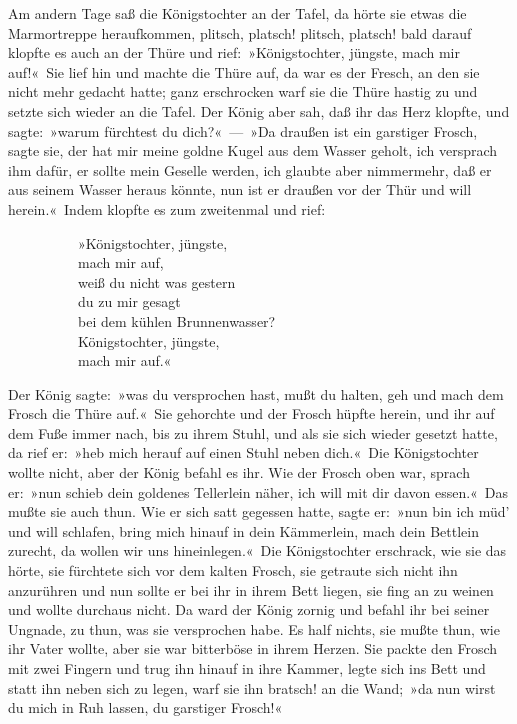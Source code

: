 Am andern Tage saß die Königstochter an der Tafel, da hörte sie etwas die Marmortreppe heraufkommen, plitsch, platsch! plitsch, platsch! bald darauf klopfte es auch an der Thüre und rief: »Königstochter, jüngste, mach mir auf!« Sie lief hin und machte die Thüre auf, da war es der Fresch, an den sie nicht mehr gedacht hatte; ganz erschrocken warf sie die Thüre hastig zu und setzte sich wieder an die Tafel. Der König aber sah, daß ihr das Herz klopfte, und sagte: »warum fürchtest du dich?« — »Da draußen ist ein garstiger Frosch, sagte sie, der hat mir meine goldne Kugel aus dem Wasser geholt, ich versprach ihm dafür, er sollte mein Geselle werden, ich glaubte aber nimmermehr, daß er aus seinem Wasser heraus könnte, nun ist er draußen vor der Thür und will herein.« Indem klopfte es zum zweitenmal und rief:

          »Königstochter, jüngste,\\
          mach mir auf,\\
          weiß du nicht was gestern\\
          du zu mir gesagt\\
          bei dem kühlen Brunnenwasser?\\
          Königstochter, jüngste,\\
          mach mir auf.«

Der König sagte: »was du versprochen hast, mußt du halten, geh und mach dem Frosch die Thüre auf.« Sie gehorchte und der Frosch hüpfte herein, und ihr auf dem Fuße immer nach, bis zu ihrem Stuhl, und als sie sich wieder gesetzt hatte, da rief er: »heb mich herauf auf einen Stuhl neben dich.« Die Königstochter wollte nicht, aber der König befahl es ihr. Wie der Frosch oben war, sprach er: »nun schieb dein goldenes Tellerlein näher, ich will mit dir davon essen.« Das mußte sie auch thun. Wie er sich satt gegessen hatte, sagte er: »nun bin ich müd’ und will schlafen, bring mich hinauf in dein Kämmerlein, mach dein Bettlein zurecht, da wollen wir uns hineinlegen.« Die Königstochter erschrack, wie sie das hörte, sie fürchtete sich vor dem kalten Frosch, sie getraute sich nicht ihn anzurühren und nun sollte er bei ihr in ihrem Bett liegen, sie fing an zu weinen und wollte durchaus nicht. Da ward der König zornig und befahl ihr bei seiner Ungnade, zu thun, was sie versprochen habe. Es half nichts, sie mußte thun, wie ihr Vater wollte, aber sie war bitterböse in ihrem Herzen. Sie packte den Frosch mit zwei Fingern und trug ihn hinauf in ihre Kammer, legte sich ins Bett und statt ihn neben sich zu legen, warf sie ihn bratsch! an die Wand; »da nun wirst du mich in Ruh lassen, du garstiger Frosch!«

